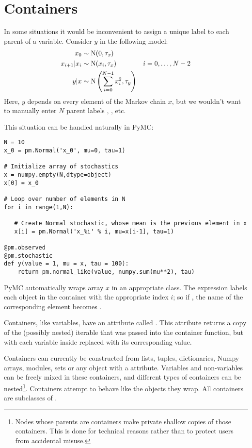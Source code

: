 \section{Containers} \label{container}

In some situations it would be inconvenient to assign a unique label to each parent of a variable. Consider $y$ in the following model:
\begin{align*}
    x_0 &\sim \textup N (0,\tau_x)\\
    x_{i+1}|x_i &\sim \textup{N}(x_i, \tau_x)
    &i=0,\ldots, N-2\\
    y|x &\sim \textup N \left(\sum_{i=0}^{N-1}x_i^2,\tau_y\right)
\end{align*}
Here, $y$ depends on every element of the Markov chain $x$, but we wouldn't want to manually enter $N$ parent labels , , etc.

This situation can be handled naturally in PyMC:
\begin{verbatim}
N = 10
x_0 = pm.Normal('x_0', mu=0, tau=1)

# Initialize array of stochastics
x = numpy.empty(N,dtype=object)
x[0] = x_0

# Loop over number of elements in N
for i in range(1,N):

   # Create Normal stochastic, whose mean is the previous element in x
   x[i] = pm.Normal('x_%i' % i, mu=x[i-1], tau=1)

@pm.observed
@pm.stochastic
def y(value = 1, mu = x, tau = 100):
    return pm.normal_like(value, numpy.sum(mu**2), tau)
\end{verbatim}
PyMC automatically wraps array $x$ in an appropriate  class. The  expression  labels each  object in the container with the appropriate index $i$; so if , the name of the corresponding element becomes .

Containers, like variables, have an attribute called . This attribute returns a copy of the (possibly nested) iterable that was passed into the container function, but with each variable inside replaced with its corresponding value.

Containers can currently be constructed from lists, tuples, dictionaries, Numpy arrays, modules, sets or any object with a  attribute. Variables and non-variables can be freely mixed in these containers, and different types of containers can be nested\footnote{Nodes whose parents are containers make private shallow copies of those containers. This is done for technical reasons rather than to protect users from accidental misuse.}. Containers attempt to behave like the objects they wrap. All containers are subclasses of .

